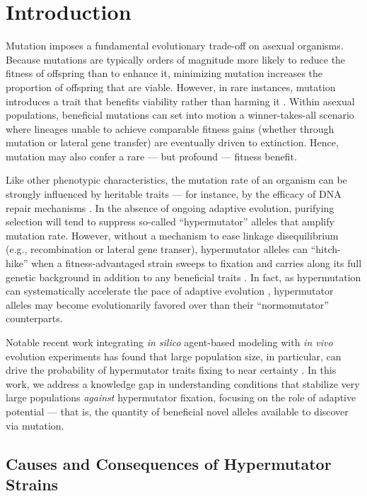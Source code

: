 \section{Introduction} \label{sec:introduction}

Mutation imposes a fundamental evolutionary trade-off on asexual organisms.
Because mutations are typically orders of magnitude more likely to reduce the fitness of offspring than to enhance it, minimizing mutation increases the proportion of offspring that are viable.
However, in rare instances, mutation introduces a trait that benefits viability rather than harming it \citep{zeyl2004capturing,rozen2002fitness} .
Within asexual populations, beneficial mutations can set into motion a winner-takes-all scenario where lineages unable to achieve comparable fitness gains (whether through mutation or lateral gene transfer) are eventually driven to extinction.
Hence, mutation may also confer a rare --- but profound --- fitness benefit.

Like other phenotypic characteristics, the mutation rate of an organism can be strongly influenced by heritable traits --- for instance, by the efficacy of DNA repair mechanisms \citep{sniegowski2000evolution}.
In the absence of ongoing adaptive evolution, purifying selection will tend to suppress so-called ``hypermutator'' alleles that amplify mutation rate.
However, without a mechanism to ease linkage disequilibrium (e.g., recombination or lateral gene transer), hypermutator alleles can  ``hitch-hike'' when a fitness-advantaged strain sweeps to fixation and carries along its full genetic background in addition to any beneficial traits \citep{chao1983competition,johnson1999beneficial,gentile2011competition}.
In fact, as hypermutation can systematically accelerate the pace of adaptive evolution \citep{orr2000rate}, hypermutator alleles may become evolutionarily favored over than their ``normomutator'' counterparts.

Notable recent work integrating \textit{in silico} agent-based modeling with \textit{in vivo} evolution experiments has found that large population size, in particular, can drive the probability of hypermutator traits fixing to near certainty \citep{raynes2018sign}.
In this work, we address a knowledge gap in understanding conditions that stabilize very large populations \textit{against} hypermutator fixation, focusing on the role of adaptive potential --- that is, the quantity of beneficial novel alleles available to discover via mutation.

\subsection{Causes and Consequences of Hypermutator Strains}

